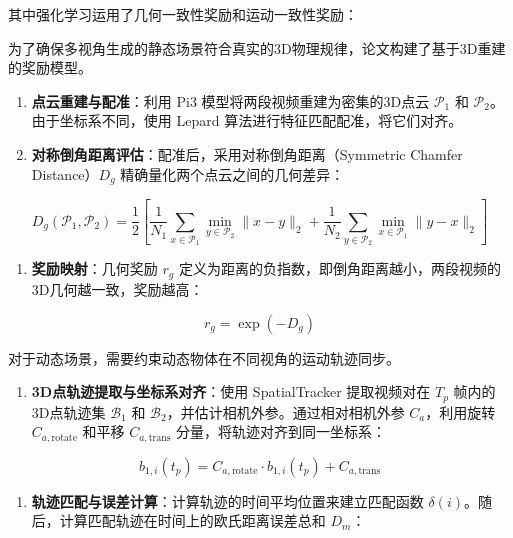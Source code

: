 其中强化学习运用了几何一致性奖励和运动一致性奖励：

为了确保多视角生成的静态场景符合真实的3D物理规律，论文构建了基于3D重建的奖励模型。

\begin{enumerate}
\def\labelenumi{\arabic{enumi}.}
\tightlist
\item
  \textbf{点云重建与配准}：利用 Pi3 模型将两段视频重建为密集的3D点云 \(\mathcal{P}_1\) 和 \(\mathcal{P}_2\)。由于坐标系不同，使用 Lepard 算法进行特征匹配配准，将它们对齐。
\item
  \textbf{对称倒角距离评估}：配准后，采用对称倒角距离（Symmetric Chamfer Distance）\(D_g\) 精确量化两个点云之间的几何差异：
\end{enumerate}

\[
D_g(\mathcal{P}_1,\mathcal{P}_2)=\frac{1}{2}\left[\frac{1}{N_1}\sum_{x\in\mathcal{P}_1}\min_{y\in\mathcal{P}_2}\lVert x-y\rVert_2+\frac{1}{N_2}\sum_{y\in\mathcal{P}_2}\min_{x\in\mathcal{P}_1}\lVert y-x\rVert_2\right]
\]

\begin{enumerate}
\def\labelenumi{\arabic{enumi}.}
\setcounter{enumi}{2}
\tightlist
\item
  \textbf{奖励映射}：几何奖励 \(r_g\) 定义为距离的负指数，即倒角距离越小，两段视频的3D几何越一致，奖励越高：
\end{enumerate}

\[
r_g = \exp(-D_g)
\]

对于动态场景，需要约束动态物体在不同视角的运动轨迹同步。

\begin{enumerate}
\def\labelenumi{\arabic{enumi}.}
\tightlist
\item
  \textbf{3D点轨迹提取与坐标系对齐}：使用 SpatialTracker 提取视频对在 \(T_p\) 帧内的3D点轨迹集 \(\mathcal{B}_1\) 和 \(\mathcal{B}_2\)，并估计相机外参。通过相对相机外参 \(C_a\)，利用旋转 \(C_{a,\mathrm{rotate}}\) 和平移 \(C_{a,\mathrm{trans}}\) 分量，将轨迹对齐到同一坐标系：
\end{enumerate}

\[
b_{1,i}(t_p) = C_{a,\mathrm{rotate}} \cdot b_{1,i}(t_p) + C_{a,\mathrm{trans}}
\]

\begin{enumerate}
\def\labelenumi{\arabic{enumi}.}
\setcounter{enumi}{1}
\tightlist
\item
  \textbf{轨迹匹配与误差计算}：计算轨迹的时间平均位置来建立匹配函数 \(\delta(i)\)。随后，计算匹配轨迹在时间上的欧氏距离误差总和 \(D_m\)：
\end{enumerate}


